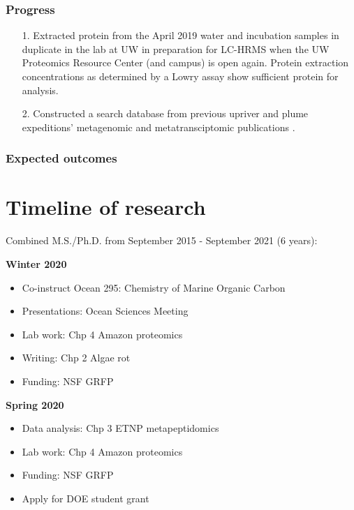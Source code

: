 \documentclass[12pt, letterpaper, twoside]{article}
\begin{document}
\subsubsection*{Progress}


\begin{enumerate}
	\item[1.] Extracted protein from the April 2019 water and incubation samples in duplicate in the lab at UW in preparation for LC-HRMS when the UW Proteomics Resource Center (and campus) is open again. Protein extraction concentrations as determined by a Lowry assay show sufficient protein for analysis. 
	\item[2.] Constructed a search database from previous upriver and plume expeditions' metagenomic and metatransciptomic publications \cite{satinsky_amazon_2014, doherty_bacterial_2017, satinsky_metagenomic_2015, ghai_metagenomics_2011}.
\end{enumerate}

\subsubsection*{Expected outcomes}

\newpage

\section{Timeline of research}

Combined M.S./Ph.D. from September 2015 - September 2021 (6 years):

\bigskip

\textbf{Winter 2020}
\begin{itemize}
	\item Co-instruct Ocean 295: Chemistry of Marine Organic Carbon
	\item Presentations: Ocean Sciences Meeting
	\item Lab work: Chp 4 Amazon proteomics
	\item Writing: Chp 2 Algae rot
	\item Funding: NSF GRFP
\end{itemize}

\textbf{Spring 2020}
\begin{itemize}
	\item Data analysis: Chp 3 ETNP metapeptidomics
	\item Lab work: Chp 4 Amazon proteomics
	\item Funding: NSF GRFP
	\item Apply for DOE student grant
\end{itemize}
\end{document}
